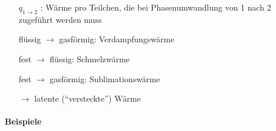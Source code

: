 \begin{itemize}
    \item[$q_{1\to 2}$]: Wärme pro Teilchen, die bei Phasenumwandlung von 1 nach 2 zugeführt werden muss
    \item[] flüssig $\rightarrow$ gasförmig: Verdampfungswärme
    \item[] fest $\rightarrow$ flüssig: Schmelzwärme
    \item[] fest $\rightarrow$ gasförmig: Sublimationswärme
    \item[$\rightarrow$] latente (\enquote{versteckte}) Wärme
\end{itemize}

\paragraph{Beispiele}
